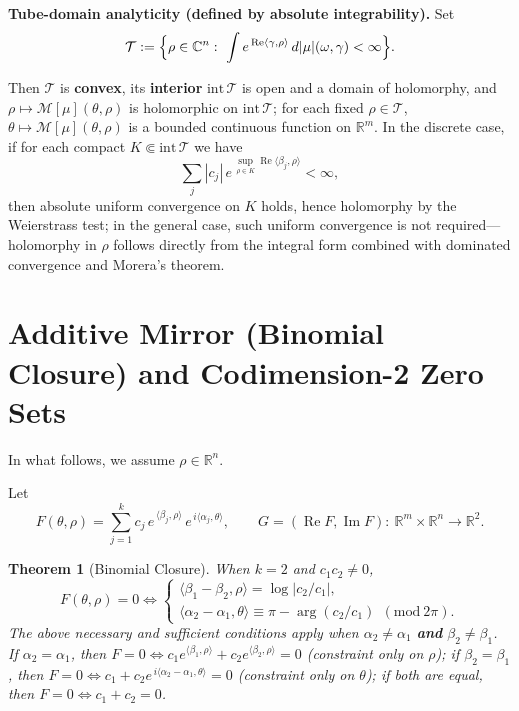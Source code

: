 \documentclass[11pt,a4paper]{article}
\newtheorem{theorem}{Theorem}[section]
\theoremstyle{remark}
\DeclareMathOperator{\Re}{Re}
\DeclareMathOperator{\Im}{Im}
\begin{document}
\textbf{Tube-domain analyticity (defined by absolute integrability).} Set
\begin{equation}
\mathcal{T}:=\Bigl\{\rho\in\mathbb{C}^n:\ \int e^{\,\Re\langle\gamma,\rho\rangle}\,d|\mu|(\omega,\gamma)<\infty\Bigr\}.
\end{equation}

Then $\mathcal{T}$ is \textbf{convex}, its \textbf{interior} $\mathrm{int}\,\mathcal{T}$ is open and a domain of holomorphy, and $\rho\mapsto\mathcal{M}[\mu](\theta,\rho)$ is holomorphic on $\mathrm{int}\,\mathcal{T}$; for each fixed $\rho\in\mathcal{T}$, $\theta\mapsto\mathcal{M}[\mu](\theta,\rho)$ is a bounded continuous function on $\mathbb{R}^m$. In the discrete case, if for each compact $K\Subset\mathrm{int}\,\mathcal{T}$ we have
\begin{equation}
\sum_j |c_j|\,e^{\,\sup_{\rho\in K}\Re\langle\beta_j,\rho\rangle}<\infty,
\end{equation}
then absolute uniform convergence on $K$ holds, hence holomorphy by the Weierstrass test; in the general case, such uniform convergence is not required---holomorphy in $\rho$ follows directly from the integral form combined with dominated convergence and Morera's theorem.

\section{Additive Mirror (Binomial Closure) and Codimension-2 Zero Sets}

In what follows, we assume $\rho\in\mathbb{R}^n$.

Let
\begin{equation}
F(\theta,\rho)=\sum_{j=1}^{k} c_j\,e^{\,\langle\beta_j,\rho\rangle}\,e^{\,i\langle\alpha_j,\theta\rangle},\qquad
G=(\Re F,\Im F):\ \mathbb{R}^m\times\mathbb{R}^n\to\mathbb{R}^2 .
\end{equation}

\begin{theorem}[Binomial Closure]\label{thm:binomial}
When $k=2$ and $c_1c_2\neq0$,
\begin{equation}
F(\theta,\rho)=0
\iff
\begin{cases}
\langle\beta_1-\beta_2,\rho\rangle=\log|c_2/c_1|,\\[2pt]
\langle\alpha_2-\alpha_1,\theta\rangle\equiv \pi-\arg(c_2/c_1)\ \ (\mathrm{mod}\ 2\pi).
\end{cases}
\end{equation}
The above necessary and sufficient conditions apply when $\alpha_2\neq\alpha_1$ \textbf{and} $\beta_2\neq\beta_1$.
If $\alpha_2=\alpha_1$, then $F=0 \iff c_1 e^{\langle\beta_1,\rho\rangle}+c_2 e^{\langle\beta_2,\rho\rangle}=0$ (constraint only on $\rho$);
if $\beta_2=\beta_1$, then $F=0 \iff c_1+c_2 e^{\,i\langle\alpha_2-\alpha_1,\theta\rangle}=0$ (constraint only on $\theta$);
if both are equal, then $F=0 \iff c_1+c_2=0$.
\end{theorem}
\end{document}

